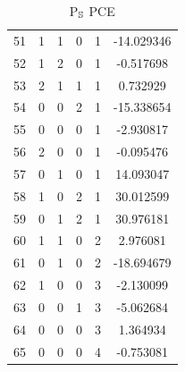 \documentclass[preprint,12pt]{elsarticle}
\begin{document}
\begin{table}
\begin{minipage}[!h]{0.25\textwidth}
{\begin{tabular}{|c|cccc|c|}
51 &   1 &   1 &   0 &   1 &  -14.029346 \\
52 &   1 &   2 &   0 &   1 &   -0.517698 \\
53 &   2 &   1 &   1 &   1 &    0.732929 \\
54 &   0 &   0 &   2 &   1 &  -15.338654 \\
55 &   0 &   0 &   0 &   1 &   -2.930817 \\
56 &   2 &   0 &   0 &   1 &   -0.095476 \\
57 &   0 &   1 &   0 &   1 &   14.093047 \\
58 &   1 &   0 &   2 &   1 &   30.012599 \\
59 &   0 &   1 &   2 &   1 &   30.976181 \\
60 &   1 &   1 &   0 &   2 &    2.976081 \\
61 &   0 &   1 &   0 &   2 &  -18.694679 \\
62 &   1 &   0 &   0 &   3 &   -2.130099 \\
63 &   0 &   0 &   1 &   3 &   -5.062684 \\
64 &   0 &   0 &   0 &   3 &    1.364934 \\
65 &   0 &   0 &   0 &   4 &   -0.753081 \\
\hline
\end{tabular}}
\caption{P$_{\mathbb{S}}$ PCE}
\end{minipage}%
%
\begin{minipage}[!h]{0.25\textwidth}
\end{minipage}
\end{table}
\end{document}
